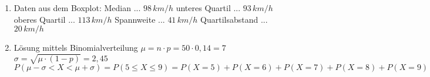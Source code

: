 \begin{langesbeispiel}
{\begin{enumerate}
	$$\overline{x}=\frac{1}{10}\cdot\sum_{i=1}^{10}{x_i=103,3}\,km/h$$
	$$s=\sqrt{\frac{1}{9}\cdot\sum_{i=1}^{10}{(x_i-\overline{x})²}}=13,6\,km/h$$
	\item Daten aus dem Boxplot:
		 \subitem Median ... $98\,km/h$
		 \subitem unteres Quartil ... $93\,km/h$
		\subitem oberes Quartil ... $113\,km/h$
		\subitem Spannweite ... $41\,km/h$
		\subitem Quartilsabstand ... $20\,km/h$
	\item Lösung mittels Binomialverteilung
	\subitem $\mu=n\cdot p=50\cdot 0,14=7$
	\subitem $\sigma=\sqrt{\mu\cdot (1-p)}=2,45$
	\subitem $P(\mu-\sigma<X<\mu+\sigma)=P(5\leq X\leq 9)=P(X=5)+P(X=6)+P(X=7)+P(X=8)+P(X=9)=0,1286+0,1570+0,1606+0,1406+0,1068=0,6936=69,36\,\%$
\end{enumerate}}
\end{langesbeispiel}